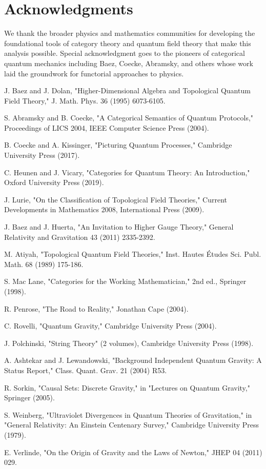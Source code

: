 \documentclass[11pt,a4paper]{article}
\begin{document}
\section*{Acknowledgments}

We thank the broader physics and mathematics communities for developing the foundational tools of category theory and quantum field theory that make this analysis possible. Special acknowledgment goes to the pioneers of categorical quantum mechanics including Baez, Coecke, Abramsky, and others whose work laid the groundwork for functorial approaches to physics.

\begin{thebibliography}{99}

 J. Baez and J. Dolan, "Higher-Dimensional Algebra and Topological Quantum Field Theory," J. Math. Phys. 36 (1995) 6073-6105.

 S. Abramsky and B. Coecke, "A Categorical Semantics of Quantum Protocols," Proceedings of LICS 2004, IEEE Computer Science Press (2004).

 B. Coecke and A. Kissinger, "Picturing Quantum Processes," Cambridge University Press (2017).

 C. Heunen and J. Vicary, "Categories for Quantum Theory: An Introduction," Oxford University Press (2019).

 J. Lurie, "On the Classification of Topological Field Theories," Current Developments in Mathematics 2008, International Press (2009).

 J. Baez and J. Huerta, "An Invitation to Higher Gauge Theory," General Relativity and Gravitation 43 (2011) 2335-2392.

 M. Atiyah, "Topological Quantum Field Theories," Inst. Hautes Études Sci. Publ. Math. 68 (1989) 175-186.

 S. Mac Lane, "Categories for the Working Mathematician," 2nd ed., Springer (1998).

 R. Penrose, "The Road to Reality," Jonathan Cape (2004).

 C. Rovelli, "Quantum Gravity," Cambridge University Press (2004).

 J. Polchinski, "String Theory" (2 volumes), Cambridge University Press (1998).

 A. Ashtekar and J. Lewandowski, "Background Independent Quantum Gravity: A Status Report," Class. Quant. Grav. 21 (2004) R53.

 R. Sorkin, "Causal Sets: Discrete Gravity," in "Lectures on Quantum Gravity," Springer (2005).

 S. Weinberg, "Ultraviolet Divergences in Quantum Theories of Gravitation," in "General Relativity: An Einstein Centenary Survey," Cambridge University Press (1979).

 E. Verlinde, "On the Origin of Gravity and the Laws of Newton," JHEP 04 (2011) 029.

\end{thebibliography}
\end{document}
